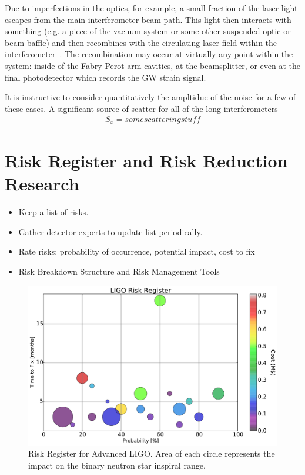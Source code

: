 \begin{itmemize}
Due to imperfections in the optics, for example, a small fraction of the laser light escapes from the main interferometer beam path. This light then interacts with something (e.g. a piece of the vacuum system or some other suspended optic or beam baffle) and then recombines with the circulating laser field within the 
interferometer~\cite{Kip:Baffles, Ottaway:scatter, Virgo:scatter, Partha:scatter}. The recombination may occur at virtually any point within the system: inside of the Fabry-Perot arm cavities, at the beamsplitter, or even at the final photodetector which records the GW strain signal.

It is instructive to consider quantitatively the ampltidue of the noise for a few of these cases. A significant source of scatter for all of the long interferometers
\begin{align}
S_x = some scattering stuff
\end{align}


\section{Risk Register and Risk Reduction Research}
\begin{itemize}
\item Keep a list of risks.
\item Gather detector experts to update list periodically.
\item Rate risks: probability of occurrence, potential impact, cost to fix
\item Risk Breakdown Structure and Risk Management Tools
\end{itemize}

\begin{figure}[h]
\centering
\includegraphics[width=\columnwidth]{Figures/Risk.pdf}
\caption{Risk Register for Advanced LIGO. Area of each circle represents the impact on the binary neutron star inspiral range.}
\label{fig:RiskBubbles}
\end{figure}



\end{itmemize}
